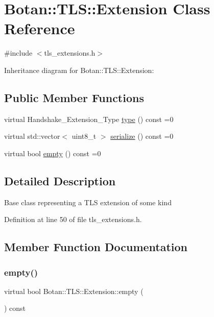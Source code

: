 \hypertarget{class_botan_1_1_t_l_s_1_1_extension}{}\section{Botan\+:\+:T\+LS\+:\+:Extension Class Reference}
\label{class_botan_1_1_t_l_s_1_1_extension}


{\ttfamily \#include $<$tls\+\_\+extensions.\+h$>$}



Inheritance diagram for Botan\+:\+:T\+LS\+:\+:Extension\+:
\subsection*{Public Member Functions}
\begin{DoxyCompactItemize}
\item 
virtual Handshake\+\_\+\+Extension\+\_\+\+Type \mbox{\hyperlink{class_botan_1_1_t_l_s_1_1_extension_ac8819b312ce604453225e7b4f7c373ec}{type}} () const =0
\item 
virtual std\+::vector$<$ uint8\+\_\+t $>$ \mbox{\hyperlink{class_botan_1_1_t_l_s_1_1_extension_a56788726ad2526db54e5a26039cb69db}{serialize}} () const =0
\item 
virtual bool \mbox{\hyperlink{class_botan_1_1_t_l_s_1_1_extension_aa850b9be2322f94e7c65e583cd51acc5}{empty}} () const =0
\end{DoxyCompactItemize}


\subsection{Detailed Description}
Base class representing a T\+LS extension of some kind 

Definition at line 50 of file tls\+\_\+extensions.\+h.



\subsection{Member Function Documentation}
\mbox{\label{class_botan_1_1_t_l_s_1_1_extension_aa850b9be2322f94e7c65e583cd51acc5}} 
\subsubsection{\texorpdfstring{empty()}{empty()}}
{\footnotesize\ttfamily virtual bool Botan\+::\+T\+L\+S\+::\+Extension\+::empty (\begin{DoxyParamCaption}{ }\end{DoxyParamCaption}) const\hspace{0.3cm}{\ttfamily [pure virtual]}}

